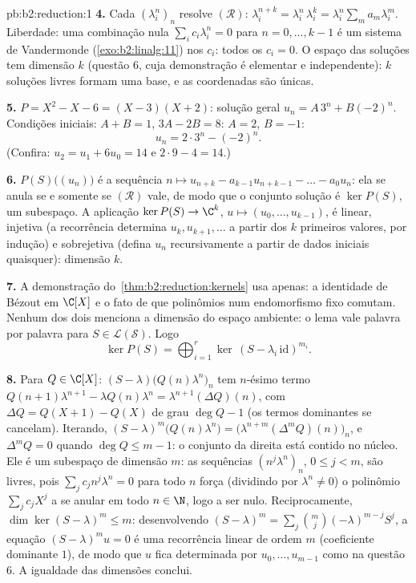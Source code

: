 \begin{solution}{pb:b2:reduction:1}
\textbf{4.} Cada $(\lambda_i^n)_n$ resolve $(\mathcal R)$:
$\lambda_i^{n+k} = \lambda_i^n\,\lambda_i^k =
\lambda_i^n\sum_m a_m\lambda_i^m$. Liberdade: uma combinação
nula $\sum_i c_i\lambda_i^n = 0$ para $n = 0, \dots, k-1$
é um sistema de Vandermonde (\cref{exo:b2:linalg:11}) nos $c_i$:
todos os $c_i = 0$. O espaço das soluções tem dimensão $k$ (questão 6,
cuja demonstração é elementar e independente): $k$ soluções livres
formam uma base, e as coordenadas são únicas.

\textbf{5.} $P = X^2 - X - 6 = (X - 3)(X + 2)$: solução geral
$u_n = A\,3^n + B(-2)^n$. Condições iniciais: $A + B = 1$, $3A -
2B = 8$: $A = 2$, $B = -1$:
\[
u_n = 2\cdot 3^n - (-2)^n .
\]
(Confira: $u_2 = u_1 + 6u_0 = 14$ e $2\cdot9 - 4 = 14$.)

\textbf{6.} $P(S)\bigl((u_n)\bigr)$ é a sequência $n \mapsto
u_{n+k} - a_{k-1}u_{n+k-1} - \dots - a_0u_n$: ela se anula se e somente se
$(\mathcal R)$ vale, de modo que o conjunto solução é $\ker P(S)$, um
subespaço. A aplicação $\ker P(S) \to \C^k$, $u \mapsto (u_0, \dots,
u_{k-1})$, é linear, injetiva (a recorrência determina
$u_{k}, u_{k+1}, \dots$ a partir dos $k$ primeiros valores, por indução)
e sobrejetiva (defina $u_n$ recursivamente a partir de dados iniciais quaisquer):
dimensão $k$.

\textbf{7.} A demonstração do~\cref{thm:b2:reduction:kernels} usa
apenas: a identidade de Bézout em $\C[X]$ e o fato de que
polinômios num endomorfismo fixo comutam. Nenhum dos dois menciona
a dimensão do espaço ambiente: o lema vale palavra por palavra para
$S \in \mathcal{L}(\mathcal{S})$. Logo
\[
\ker P(S) = \bigoplus_{i=1}^{r}
\ker\,(S - \lambda_i\,\mathrm{id})^{m_i}.
\]

\textbf{8.} Para $Q \in \C[X]$: $(S -
\lambda)\bigl(Q(n)\lambda^n\bigr)_n$ tem $n$-ésimo termo
$Q(n{+}1)\lambda^{n+1} - \lambda Q(n)\lambda^n =
\lambda^{n+1}(\Delta Q)(n)$, com $\Delta Q = Q(X{+}1) - Q(X)$
de grau $\deg Q - 1$ (os termos dominantes se cancelam). Iterando,
$(S - \lambda)^m\bigl(Q(n)\lambda^n\bigr) =
\bigl(\lambda^{n+m}(\Delta^m Q)(n)\bigr)_n$, e $\Delta^m Q = 0$
quando $\deg Q \leq m - 1$: o conjunto da direita está contido no
núcleo. Ele é um subespaço de dimensão $m$: as sequências
$(n^j\lambda^n)_n$, $0 \leq j < m$, são livres, pois
$\sum_j c_j n^j\lambda^n = 0$ para todo $n$ força (dividindo por
$\lambda^n \neq 0$) o polinômio $\sum_j c_jX^j$ a se anular em
todo $n \in \N$, logo a ser nulo. Reciprocamente, $\dim\ker(S -
\lambda)^m \leq m$: desenvolvendo $(S - \lambda)^m = \sum_j
\binom mj(-\lambda)^{m-j}S^j$, a equação $(S - \lambda)^m u =
0$ é uma recorrência linear de ordem $m$ (coeficiente dominante
$1$), de modo que $u$ fica determinada por $u_0, \dots, u_{m-1}$ como na
questão 6. A igualdade das dimensões conclui.


\end{solution}
